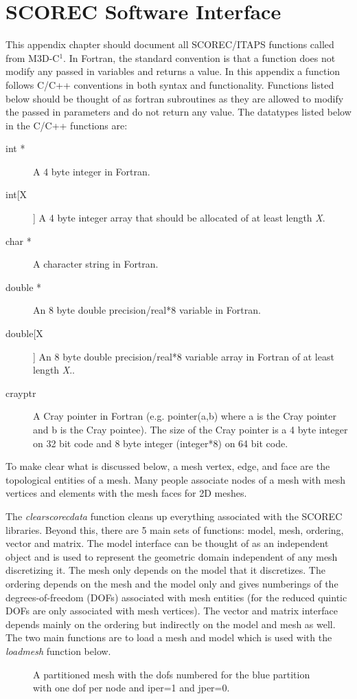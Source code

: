 \chapter{SCOREC Software Interface}
This appendix chapter should document all SCOREC/ITAPS functions called from M3D-C$^1$. 
  In Fortran, the standard convention
is that a function does not modify any passed in variables and returns a value. 
In this appendix a function follows C/C++ conventions in both syntax and functionality. 
Functions listed below should be thought of as fortran subroutines as they are allowed
to modify the passed in parameters and do not return any value. 
The datatypes listed below in the C/C++ functions are:
\begin{description}
\item[int *] A 4 byte integer in Fortran.
\item[int[X]] A 4 byte integer array that should be allocated of at least length \textit{X}.
\item[char *] A character string in Fortran.
\item[double *] An 8 byte double precision/real*8 variable in Fortran.
\item[double[X]]  An 8 byte double precision/real*8 variable array in Fortran of at least length \textit{X}..
\item[crayptr] A Cray pointer in Fortran (e.g. pointer(a,b) where a is the Cray pointer and b is the Cray 
pointee).  The size of the Cray pointer is a 4 byte integer on 32 bit code and 8 byte integer (integer*8)
on 64 bit code.  
\end{description}
To make clear what is discussed below, a mesh vertex, edge, and face are the topological
entities of a mesh.  Many people associate nodes of a mesh with mesh vertices and elements with
the mesh faces for 2D meshes.  

The \textit{clearscorecdata} function cleans up everything associated with the SCOREC libraries.
Beyond this, there are 5 main sets of functions: model, mesh, ordering, vector and matrix.  The model
interface can be thought of as an independent object and is used to represent the geometric domain independent
of any mesh discretizing it.  The mesh only depends on the model that it discretizes.  The ordering
depends on the mesh and the model only and gives numberings of the degrees-of-freedom (DOFs) associated
with mesh entities (for the reduced quintic DOFs are only associated with mesh vertices).  The vector
and matrix interface depends mainly on the ordering but indirectly on the model and mesh as well.
 The two main functions
are to load a mesh and model which is used with the \textit{loadmesh} function below.  
\begin{center}
\begin{figure}
\centerline{} %
\caption{A partitioned mesh with the dofs numbered for the blue partition with one dof per node and iper=1 and jper=0.}\label{meshpartition} \end{figure}
\end{center}



